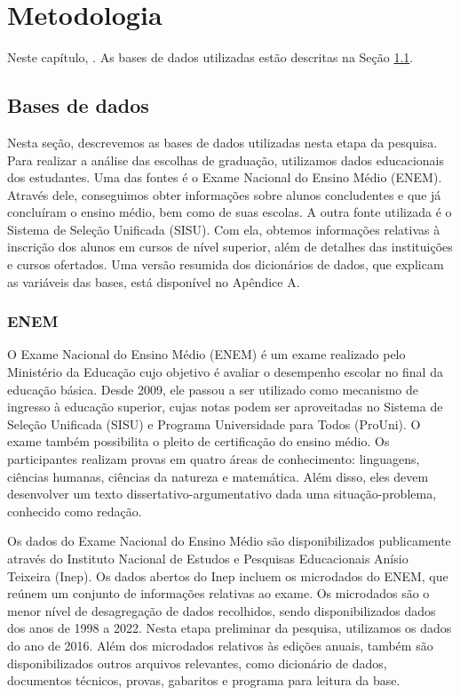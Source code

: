 
\chapter{Metodologia}
\label{chap:metodologia}

Neste capítulo, . As bases de dados utilizadas estão descritas na Seção \ref{sec:bases}. 

\section{Bases de dados}
\label{sec:bases}
Nesta seção, descrevemos as bases de dados utilizadas nesta etapa da pesquisa. Para realizar a análise das escolhas de graduação, utilizamos dados educacionais dos estudantes. Uma das fontes é o Exame Nacional do Ensino Médio (ENEM). Através dele, conseguimos obter informações sobre alunos concludentes e que já concluíram o ensino médio, bem como de suas escolas. A outra fonte utilizada é o Sistema de Seleção Unificada (SISU). Com ela, obtemos informações relativas à inscrição dos alunos em cursos de nível superior, além de detalhes das instituições e cursos ofertados. Uma versão resumida dos dicionários de dados, que explicam as variáveis das bases, está disponível no Apêndice A. 

\subsection{ENEM}
O Exame Nacional do Ensino Médio (ENEM) é um exame realizado pelo Ministério da Educação cujo objetivo é avaliar o desempenho escolar no final da educação básica. Desde 2009, ele passou a ser utilizado como mecanismo de ingresso à educação superior, cujas notas podem ser aproveitadas no Sistema de Seleção Unificada (SISU) e Programa Universidade para Todos (ProUni). O exame também possibilita o pleito de certificação do ensino médio. Os participantes realizam provas em quatro áreas de conhecimento: linguagens, ciências humanas, ciências da natureza e matemática. Além disso, eles devem desenvolver um texto dissertativo-argumentativo dada uma situação-problema, conhecido como redação\autocite{inep:1}.

Os dados do Exame Nacional do Ensino Médio são disponibilizados publicamente através do Instituto Nacional de Estudos e Pesquisas Educacionais Anísio Teixeira (Inep). Os dados abertos do Inep incluem os microdados do ENEM, que reúnem um conjunto de informações relativas ao exame. Os microdados são o menor nível de desagregação de dados recolhidos, sendo disponibilizados dados dos anos de 1998 a 2022. Nesta etapa preliminar da pesquisa, utilizamos os dados do ano de 2016. Além dos microdados relativos às edições anuais, também são disponibilizados outros arquivos relevantes, como dicionário de dados, documentos técnicos, provas, gabaritos e programa para leitura da base.

